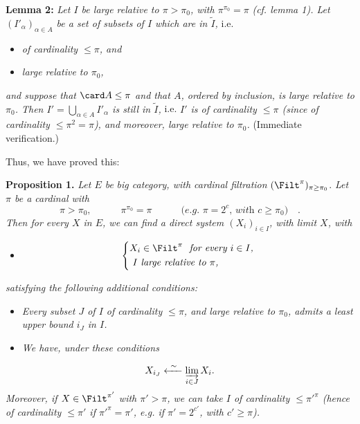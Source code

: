 \textbf{Lemma 2:} \textit{Let $I$ be large relative to $\pi>\pi_0$, with $\pi^{\pi_0}=\pi$} \textit{(cf. lemma 1). Let $(I'_\alpha)_{\alpha\in A}$ be a set of subsets of $I$ which are in $\tilde I$,} i.e.

\begin{itemize}
\item[a)] \textit{of cardinality $\le\pi$, and}
\item[b)] \textit{large relative to $\pi_0$,}
\end{itemize}

\textit{and suppose that} $\card A\le\pi$ \textit{and that $A$, ordered by inclusion, is large relative to $\pi_0$. Then $I'=\bigcup_{\alpha\in A} I'_\alpha$ is still in $\tilde I$,} i.e. \textit{$I'$ is of cardinality $\le\pi$ (since of cardinality $\le\pi^2=\pi$), and moreover, large relative to $\pi_0$.} (Immediate verification.)

Thus, we have proved this:

\textbf{Proposition 1.} \textit{Let $E$ be} \textit{big category, with cardinal filtration} $(\Filt^\pi)_{\pi\ge\pi_0}$. \textit{Let $\pi$ be a cardinal with}
\[
\pi>\pi_0, \qquad\quad \pi^{\pi_0}=\pi \qquad\quad \textit{(e.g. $\pi=2^c$, with $c\ge\pi_0$)} \quad .
\]
\textit{Then for every $X$ in $E$, we can find a direct system $(X_i)_{i\in I}$, with limit $X$, with}

\begin{itemize}
\item[a)] \[ \left\{ \begin{aligned} & X_i\in\Filt^\pi \ \ \textit{for every $i\in I$,} \\ & \ I \ \textit{large relative to $\pi$,} \end{aligned} \right. \]
\end{itemize}

\textit{satisfying the following additional conditions:}

\begin{itemize}
\item[b)] \textit{Every subset $J$ of $I$ of cardinality $\le\pi$, and large relative to $\pi_0$, admits a least upper bound $i_J$ in $I$.}
\item[c)] \textit{We have, under these conditions}
\end{itemize}

\[
X_{i_J} \xleftarrow{\ \sim\ } \varinjlim_{i\in J} X_i .
\]
\textit{Moreover, if $X\in\Filt^{\pi'}$ with $\pi'>\pi$, we can take $I$ of cardinality $\le\pi'^{\pi}$ (hence of cardinality $\le\pi'$ if $\pi'^{\pi}=\pi'$, e.g. if $\pi'=2^{c'}$, with $c'\ge\pi$).}

